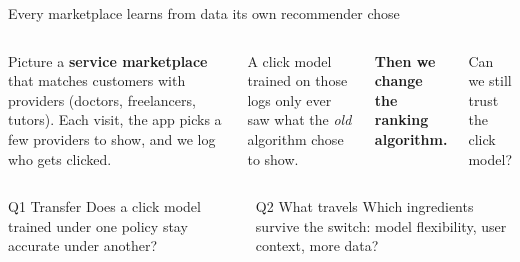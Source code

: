 \documentclass[aspectratio=169,10pt]{beamer}
\begin{document}
\begin{frame}{Every marketplace learns from data its own recommender chose}
\vspace{.15cm}
\begin{columns}[T,onlytextwidth]
Picture a \textbf{service marketplace} that matches customers with providers (doctors, freelancers, tutors). Each visit, the app picks a few providers to show, and we log who gets clicked.\par\vspace{.25cm}
A click model trained on those logs only ever saw what the \emph{old} algorithm chose to show.\par\vspace{.25cm}
\textbf{Then we change the ranking algorithm.}\par\vspace{.1cm}
Can we still trust the click model?
\vspace{-.1cm}
\end{columns}
\vspace{.35cm}
\begin{columns}[T,onlytextwidth]
\begin{block}{Q1 \textperiodcentered{} Transfer}
Does a click model trained under one policy stay accurate under another?
\end{block}
\begin{block}{Q2 \textperiodcentered{} What travels}
Which ingredients survive the switch: model flexibility, user context, more data?
\end{block}
\end{columns}
\end{frame}
\end{document}
